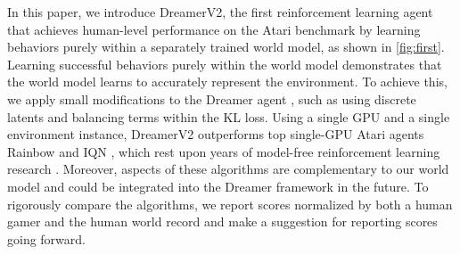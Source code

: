 In this paper, we introduce DreamerV2, the first reinforcement learning agent that achieves human-level performance on the Atari benchmark by learning behaviors purely within a separately trained world model, as shown in \cref{fig:first}. Learning successful behaviors purely within the world model demonstrates that the world model learns to accurately represent the environment. To achieve this, we apply small modifications to the Dreamer agent \citep{hafner2019dreamer}, such as using discrete latents and balancing terms within the KL loss. Using a single GPU and a single environment instance, DreamerV2 outperforms top single-GPU Atari agents Rainbow \citep{hessel2018rainbow} and IQN \citep{dabney2018iqn}, which rest upon years of model-free reinforcement learning research \citep{van2015ddqn,schaul2015prioritizedreplay,wang2016duelingdqn,bellemare2017c51,fortunato2017noisynets}. Moreover, aspects of these algorithms are complementary to our world model and could be integrated into the Dreamer framework in the future. To rigorously compare the algorithms, we report scores normalized by both a human gamer \citep{mnih2015dqn} and the human world record \citep{toromanoff2019atarirecords} and make a suggestion for reporting scores going forward.

